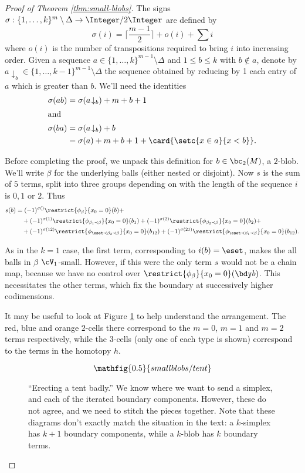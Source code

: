 \begin{proof}[Proof of Theorem \ref{thm:small-blobs}]
 The signs $\sigma: \{1, \ldots, k\}^{m} \setminus \Delta \to \Integer/2\Integer$ are defined by
$$\sigma(i)= \lceil\frac{m-1}{2}\rceil  +o(i) + \sum i$$
where $o(i)$ is the number of transpositions required to bring $i$ into increasing order. Given a sequence $a \in \{1, \ldots, k\}^{m-1} \setminus \Delta$ and $1 \leq b \leq k$ with $b \not \in a$, denote by $a \!\downarrow_b\in \{1, \ldots, k-1\}^{m-1} \setminus \Delta$ the sequence obtained by reducing by 1 each entry of $a$ which is greater than $b$. We'll need the identities
\begin{align} 
\sigma(ab) & = \sigma(a\!\downarrow_b) +m + b+1 \label{eq:sigma(ab)}\\
\intertext{and}
\sigma(ba) & = \sigma(a\!\downarrow_b) + b \notag \\
		 & = \sigma(a) + m+b + 1+\card{\setc{x \in a}{x < b}}. \label{eq:sigma(ba)}
\end{align}

Before completing the proof, we unpack this definition for $b \in \bc_2(M)$, a $2$-blob. We'll write $\beta$ for the underlying balls (either nested or disjoint).
Now $s$ is the sum of $5$ terms, split into three groups depending on with the length of the sequence $i$ is $0, 1$ or $2$. Thus
\begin{align*}
s(b) & = (-1)^{\sigma()} \restrict{\phi_{\beta}}{x_0 = 0}(b) + \\
	& \quad + (-1)^{\sigma(1)}  \restrict{\phi_{\beta_1 \prec \beta}}{x_0 = 0}(b_1) + (-1)^{\sigma(2)} \restrict{\phi_{\beta_2 \prec \beta}}{x_0 = 0}(b_2) + \\
	& \quad + (-1)^{\sigma(12)}  \restrict{\phi_{\eset \prec \beta_2 \prec \beta}}{x_0 = 0}(b_{12}) + (-1)^{\sigma(21)}  \restrict{\phi_{\eset \prec \beta_1 \prec \beta}}{x_0 = 0}(b_{12}).
\end{align*}

As in the $k=1$ case, the first term, corresponding to $i(b) = \eset$, makes the all balls in $\beta$ $\cV_1$-small. However, if this were the only term $s$ would not be a chain map, because we have no control over $\restrict{\phi_{\beta}}{x_0 = 0}(\bdy b)$. This necessitates the other terms, which fix the boundary at successively higher codimensions.

It may be useful to look at Figure \ref{fig:erectly-a-tent-badly} to help understand the arrangement. The red, blue and orange $2$-cells there correspond to the $m=0$, $m=1$ and $m=2$ terms respectively, while the $3$-cells (only one of each type is shown) correspond to the terms in the homotopy $h$.
\begin{figure}[!ht]
$$\mathfig{0.5}{smallblobs/tent}$$
\caption{``Erecting a tent badly.'' We know where we want to send a simplex, and each of the iterated boundary components. However, these do not agree, and we need to stitch the pieces together. Note that these diagrams don't exactly match the situation in the text: a $k$-simplex has $k+1$ boundary components, while a $k$-blob has $k$ boundary terms. }
\label{fig:erectly-a-tent-badly}
\end{figure}


\end{proof}
